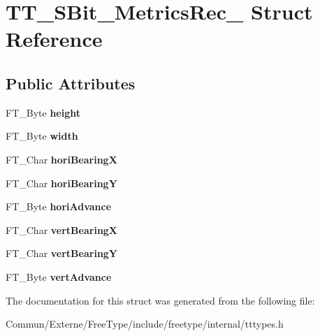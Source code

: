 \hypertarget{struct_t_t___s_bit___metrics_rec__}{}\section{T\+T\+\_\+\+S\+Bit\+\_\+\+Metrics\+Rec\+\_\+ Struct Reference}
\label{struct_t_t___s_bit___metrics_rec__}
\subsection*{Public Attributes}
\begin{DoxyCompactItemize}
\item 
F\+T\+\_\+\+Byte {\bfseries height}\hypertarget{struct_t_t___s_bit___metrics_rec___a79b25794122888101aae80c7b74fc1fc}{}\label{struct_t_t___s_bit___metrics_rec___a79b25794122888101aae80c7b74fc1fc}

\item 
F\+T\+\_\+\+Byte {\bfseries width}\hypertarget{struct_t_t___s_bit___metrics_rec___a3444618e2c2a612a662a5e0d2c3f25ef}{}\label{struct_t_t___s_bit___metrics_rec___a3444618e2c2a612a662a5e0d2c3f25ef}

\item 
F\+T\+\_\+\+Char {\bfseries hori\+BearingX}\hypertarget{struct_t_t___s_bit___metrics_rec___a786ba1081993e18d514ddf37c2662c7b}{}\label{struct_t_t___s_bit___metrics_rec___a786ba1081993e18d514ddf37c2662c7b}

\item 
F\+T\+\_\+\+Char {\bfseries hori\+BearingY}\hypertarget{struct_t_t___s_bit___metrics_rec___aaed1567b444a1bee4b3478b2cdb9259f}{}\label{struct_t_t___s_bit___metrics_rec___aaed1567b444a1bee4b3478b2cdb9259f}

\item 
F\+T\+\_\+\+Byte {\bfseries hori\+Advance}\hypertarget{struct_t_t___s_bit___metrics_rec___a8b0c5271aaf220f7a8cbf4838854e220}{}\label{struct_t_t___s_bit___metrics_rec___a8b0c5271aaf220f7a8cbf4838854e220}

\item 
F\+T\+\_\+\+Char {\bfseries vert\+BearingX}\hypertarget{struct_t_t___s_bit___metrics_rec___a626e67e02494faab653a7543bb0b7c79}{}\label{struct_t_t___s_bit___metrics_rec___a626e67e02494faab653a7543bb0b7c79}

\item 
F\+T\+\_\+\+Char {\bfseries vert\+BearingY}\hypertarget{struct_t_t___s_bit___metrics_rec___aef4755ed22ba72e5fa304920bae03146}{}\label{struct_t_t___s_bit___metrics_rec___aef4755ed22ba72e5fa304920bae03146}

\item 
F\+T\+\_\+\+Byte {\bfseries vert\+Advance}\hypertarget{struct_t_t___s_bit___metrics_rec___a947468e42759089d0b5c5fa10a0defdf}{}\label{struct_t_t___s_bit___metrics_rec___a947468e42759089d0b5c5fa10a0defdf}

\end{DoxyCompactItemize}


The documentation for this struct was generated from the following file\+:\begin{DoxyCompactItemize}
\item 
Commun/\+Externe/\+Free\+Type/include/freetype/internal/tttypes.\+h\end{DoxyCompactItemize}
